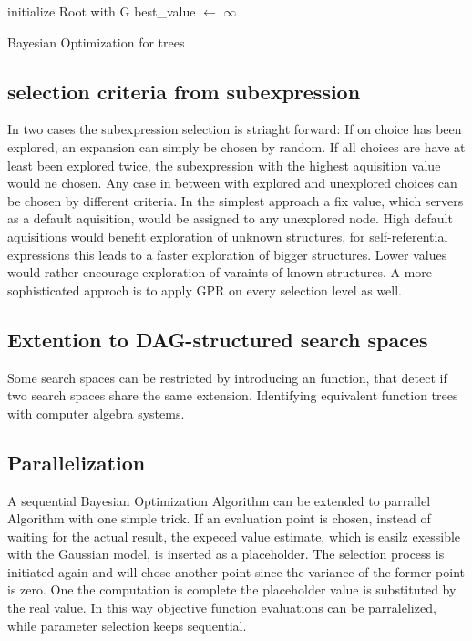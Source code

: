 \documentclass[english]{article}
\begin{document}
\begin{algorithm}[H]
\SetAlgoLined
initialize Root with G\;
best\_value $\leftarrow$ $\infty$\;


\caption{Bayesian Optimization for trees}

\end{algorithm}
%
\subsection{selection criteria from subexpression}
In two cases the subexpression selection is striaght forward: If on choice has been explored, an expansion can simply be chosen by random. If all choices are have at least been explored twice, the subexpression with the highest aquisition value would ne chosen. Any case in between with explored and unexplored choices can be chosen by different criteria.
In the simplest approach a fix value, which servers as a default aquisition, would be assigned to any unexplored node. High default aquisitions would benefit exploration of unknown structures, for self-referential expressions this leads to a faster exploration of bigger structures. Lower values would rather encourage exploration of varaints of known structures.
A more sophisticated approch is to apply \ac{GPR} on every selection level as well.


\subsection{Extention to DAG-structured search spaces}
Some search spaces can be restricted by introducing an function, that detect if two search spaces share the same extension.
Identifying equivalent function trees with computer algebra systems.

\subsection{Parallelization}
A sequential Bayesian Optimization Algorithm can be extended to parrallel Algorithm with one simple trick. If an evaluation point is chosen, instead of waiting for the actual result, the expeced value estimate, which is easilz exessible with the Gaussian model, is inserted as a placeholder. The selection process is initiated again and will chose another point since the variance of the former point is zero. One the computation is complete the placeholder value is substituted by the real value. In this way objective function evaluations can be parralelized, while parameter selection keeps sequential.
\end{document}
